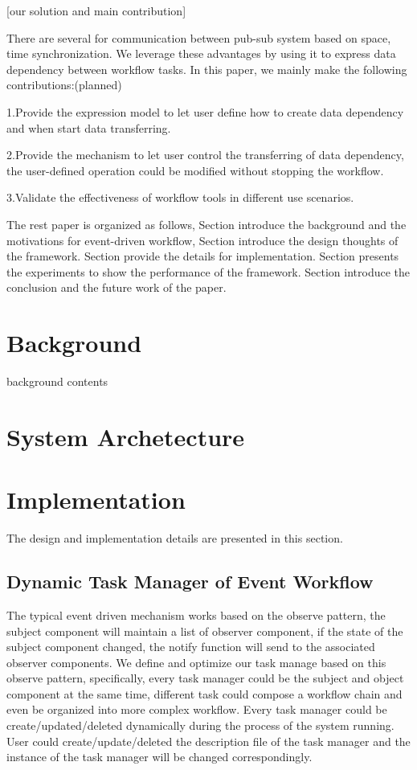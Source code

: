 \documentclass[10pt, conference, compsocconf]{IEEEtran}
\begin{document}
[our solution and main contribution]

There are several for communication between pub-sub system based on space, time synchronization. We leverage these advantages by using it to express data dependency between workflow tasks. In this paper, we mainly make the following contributions:(planned)

1.Provide the expression model to let user define how to create data dependency and when start data transferring.

2.Provide the mechanism to let user control the transferring of data dependency, the user-defined operation could be modified without stopping the workflow.

3.Validate the effectiveness of workflow tools in different use scenarios.




The rest paper is organized as follows, Section \uppercase\expandafter{} introduce the background and the motivations for event-driven workflow, Section \uppercase\expandafter{} introduce the design thoughts of the framework. Section \uppercase\expandafter{} provide the details for implementation. Section \uppercase\expandafter{} presents the experiments to show the performance of the framework. Section \uppercase\expandafter{} introduce the conclusion and the future work of the paper.





\section{Background}
background contents

\section{System Archetecture}

\section{Implementation}
The design and implementation details are presented in this section.
\subsection{Dynamic Task Manager of Event Workflow}
The typical event driven mechanism works based on the observe pattern, the subject component will maintain a list of observer component, if the state of the subject component changed, the notify function will send to the associated observer components. We define and optimize our task manage based on this observe pattern, specifically, every task manager could be the subject and object component at the same time, different task could compose a workflow chain and even be organized into more complex workflow. Every task manager could be create/updated/deleted dynamically during the process of the system running. User could create/update/deleted the description file of the task manager and the instance of the task manager will be changed correspondingly.
\end{document}
